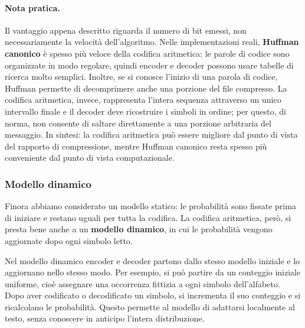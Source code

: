 \documentclass{article}
\theoremstyle{definition}
\numberwithin{equation}{section}
\begin{document}
\paragraph{Nota pratica.}
Il vantaggio appena descritto riguarda il numero di bit emessi, non necessariamente la velocità dell'algoritmo. Nelle implementazioni reali, \textbf{Huffman canonico} è spesso più veloce della codifica aritmetica: le parole di codice sono organizzate in modo regolare, quindi encoder e decoder possono usare tabelle di ricerca molto semplici. Inoltre, se si conosce l'inizio di una parola di codice, Huffman permette di decomprimere anche una porzione del file compresso. La codifica aritmetica, invece, rappresenta l'intera sequenza attraverso un unico intervallo finale e il decoder deve ricostruire i simboli in ordine; per questo, di norma, non consente di saltare direttamente a una porzione arbitraria del messaggio. In sintesi: la codifica aritmetica può essere migliore dal punto di vista del rapporto di compressione, mentre Huffman canonico resta spesso più conveniente dal punto di vista computazionale.

\subsubsection{Modello dinamico}
Finora abbiamo considerato un modello statico: le probabilità sono fissate prima di iniziare e restano uguali per tutta la codifica. La codifica aritmetica, però, si presta bene anche a un \textbf{modello dinamico}, in cui le probabilità vengono aggiornate dopo ogni simbolo letto.

Nel modello dinamico encoder e decoder partono dallo stesso modello iniziale e lo aggiornano nello stesso modo. Per esempio, si può partire da un conteggio iniziale uniforme, cioè assegnare una occorrenza fittizia a ogni simbolo dell'alfabeto. Dopo aver codificato o decodificato un simbolo, si incrementa il suo conteggio e si ricalcolano le probabilità. Questo permette al modello di adattarsi localmente al testo, senza conoscere in anticipo l'intera distribuzione.
\end{document}
